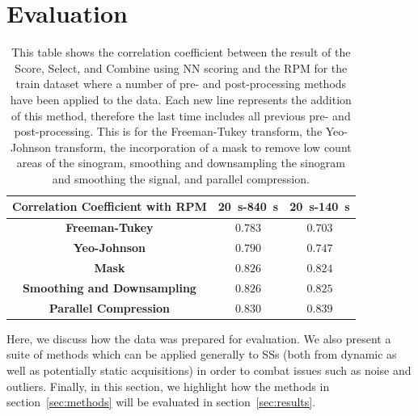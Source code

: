 \section{Evaluation} \label{sec:evaluation}
    \begin{table}
        \centering
        
        \captionsetup{singlelinecheck=false}
        \caption{This table shows the correlation coefficient between the result of the Score, Select, and Combine using \gls{NN} scoring and the \gls{RPM} for the train dataset where a number of pre- and post-processing methods have been applied to the data. Each new line represents the addition of this method, therefore the last time includes all previous pre- and post-processing. This is for the Freeman-Tukey transform, the Yeo-Johnson transform, the incorporation of a mask to remove low count areas of the sinogram, smoothing and downsampling the sinogram and smoothing the signal, and parallel compression.}
        
        \begin{tabular}{||c||c|c||}
            \hline
            \textbf{Correlation Coefficient with RPM}   & \SI{20}{\second}-\SI{840}{\second}    & \SI{20}{\second}-\SI{140}{\second} \\
            \hline
            \hline
            \textbf{Freeman-Tukey}                      & $0.783$                               & $0.703$ \\
            \hline
            \textbf{Yeo-Johnson}                        & $0.790$                               & $0.747$ \\
            \hline
            \textbf{Mask}                               & $0.826$                               & $0.824$ \\
            \hline
            \textbf{Smoothing and Downsampling}         & $0.826$                               & $0.825$ \\
            \hline
            \textbf{Parallel Compression}              & $0.830$                                & $0.839$ \\
            \hline
        \end{tabular}
        \label{tab:pre_and_post_processing_correlation}
    \end{table}
    
    Here, we discuss how the data was prepared for evaluation. We also present a suite of methods which can be applied generally to \glspl{SS} (both from dynamic as well as potentially static acquisitions) in order to combat issues such as noise and outliers. Finally, in this section, we highlight how the methods in section~\ref{sec:methods} will be evaluated in section~\ref{sec:results}.
        
